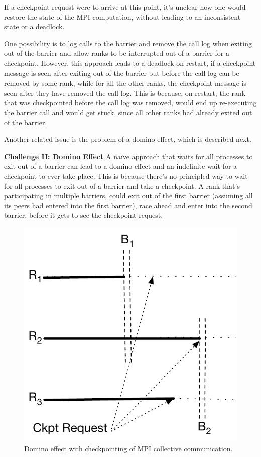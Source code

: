 \documentclass[11pt,letter]{article}
\begin{document}
If a checkpoint request were to arrive at this point, it's unclear how one
would restore the state of the MPI computation, without leading to an
inconsistent state or a deadlock.

One possibility is to log calls to the barrier and remove the call log when
exiting out of the barrier and allow ranks to be interrupted out of a barrier
for a checkpoint. However, this approach leads to a deadlock on restart, if a
checkpoint message is seen after exiting out of the barrier but before the
call log can be removed by some rank, while for all the other ranks, the
checkpoint message is seen after they have removed the call log. This is
because, on restart, the rank that was checkpointed before the call log
was removed, would end up re-executing the barrier call and would get stuck,
since all other ranks had already exited out of the barrier.

Another related issue is the problem of a domino effect, which is described
next.

\noindent \textbf{Challenge II: Domino Effect}  A na{\"i}ve approach that
waits for all processes to exit out of a barrier can lead to a domino effect
and an indefinite wait for a checkpoint to ever take place. This is because
there's no principled way to wait for all processes to exit out of a barrier
and take a checkpoint. A rank that's participating in multiple barriers, could
exit out of the first barrier (assuming all its peers had entered into the
first barrier), race ahead and enter into the second barrier, before it gets
to see the checkpoint request.

\begin{figure}[t!]
  \centering
  \includegraphics[scale=0.5]{figures/mpiDominoEffect}
  \caption{Domino effect with checkpointing of MPI collective
  communication.\label{fig:dominoEffect}}
\end{figure}
\end{document}
